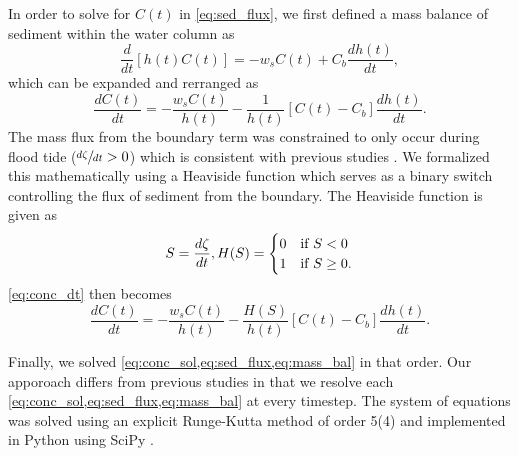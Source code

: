 In order to solve for $C(t)$ in \cref{eq:sed_flux}, we first defined a mass balance of sediment within the water column as
\begin{equation}\label{eq:conc_mass_bal}
	\frac{d}{dt}[h(t)C(t)] = -w_s C(t) + C_b \frac{dh(t)}{dt},
\end{equation}
which can be expanded and rerranged as
\begin{equation}\label{eq:conc_dt}
	\frac{dC(t)}{dt} = - \frac{w_sC(t)}{h(t)} - \frac{1}{h(t)}[C(t) - C_b]\frac{dh(t)}{dt}.
\end{equation}
The mass flux from the boundary term was constrained to only occur during flood tide ($\sfrac{d\zeta}{dt} > 0$) which is consistent with previous studies \citep{kroneMethodSimulatingMarsh1987, allenSaltmarshGrowthStratification1990, frenchNumericalSimulationVertical1993, temmermanModellingLongtermTidal2003, temmermanModellingEstuarineVariations2004}. We formalized this mathematically using a Heaviside function which serves as a binary switch controlling the flux of sediment from the boundary. The Heaviside function is given as
\begin{equation}\label{eq:heaviside}
	S = \frac{d\zeta}{dt},\\
	H(S) =
	\begin{cases}
		0 & \text{if $S < 0$}\\
		1 & \text{if $S \geq 0$}.
	\end{cases}
\end{equation}
\cref{eq:conc_dt} then becomes
\begin{equation}\label{eq:conc_sol}
	\frac{dC(t)}{dt} = - \frac{w_s C(t)}{h(t)} - \frac{H(S)}{h(t)} [C(t) - C_b]\frac{dh(t)}{dt}.
\end{equation}

Finally, we solved \cref{eq:conc_sol,eq:sed_flux,eq:mass_bal} in that order. Our apporoach differs from previous studies in that we resolve each \cref{eq:conc_sol,eq:sed_flux,eq:mass_bal} at every timestep. The system of equations was solved using an explicit Runge-Kutta method of order 5(4) \citep{dormandFamilyEmbeddedRungeKutta1980} and implemented in Python using SciPy \citep{virtanenSciPyFundamentalAlgorithms2020}.



